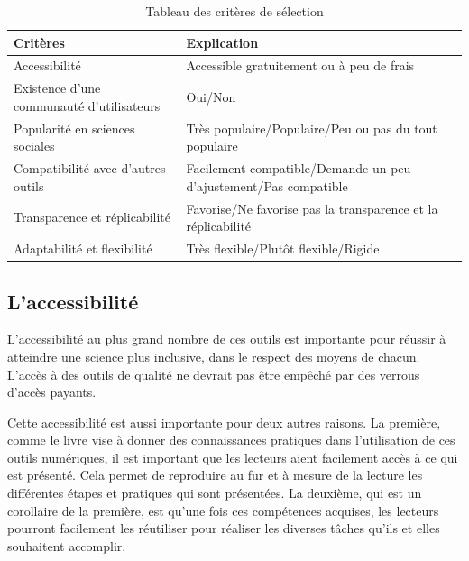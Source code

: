 \documentclass[
  letterpaper,
  DIV=11,
  numbers=noendperiod,
  oneside]{scrreprt}
\begin{document}
\newlength\holdLTleft\newlength\holdLTright\setlength\holdLTleft{\LTleft}\relax\setlength\holdLTright{\LTright}\relax\setlength{}

\setlength{}

\begin{longtable}{@{\extracolsep{\fill}}>{\raggedright\arraybackslash}p{}>{\raggedright\arraybackslash}p{}}
\caption{Tableau des critères de sélection}\tabularnewline

\toprule
Critères & Explication \\ 
\midrule\addlinespace[2.5pt]
Accessibilité & Accessible gratuitement ou à peu de frais \\ 
Existence d'une communauté d'utilisateurs & Oui/Non \\ 
Popularité en sciences sociales & Très populaire/Populaire/Peu ou pas du tout populaire \\ 
Compatibilité avec d'autres outils & Facilement compatible/Demande un peu d'ajustement/Pas compatible \\ 
Transparence et réplicabilité & Favorise/Ne favorise pas la transparence et la réplicabilité \\ 
Adaptabilité et flexibilité & Très flexible/Plutôt flexible/Rigide \\ 
\bottomrule
\end{longtable}
\setlength\LTleft{\holdLTleft}
\setlength\LTright{\holdLTright}

\hypertarget{laccessibilituxe9}{%
\subsection{L'accessibilité}\label{laccessibilituxe9}}

L'accessibilité au plus grand nombre de ces outils est importante pour
réussir à atteindre une science plus inclusive, dans le respect des
moyens de chacun. L'accès à des outils de qualité ne devrait pas être
empêché par des verrous d'accès payants.

Cette accessibilité est aussi importante pour deux autres raisons. La
première, comme le livre vise à donner des connaissances pratiques dans
l'utilisation de ces outils numériques, il est important que les
lecteurs aient facilement accès à ce qui est présenté. Cela permet de
reproduire au fur et à mesure de la lecture les différentes étapes et
pratiques qui sont présentées. La deuxième, qui est un corollaire de la
première, est qu'une fois ces compétences acquises, les lecteurs
pourront facilement les réutiliser pour réaliser les diverses tâches
qu'ils et elles souhaitent accomplir.
\end{document}
